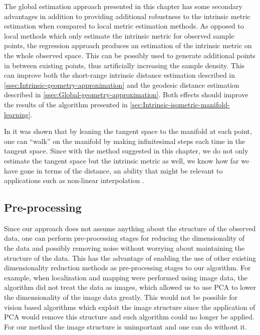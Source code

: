 	The global estimation approach presented in this chapter has some
	secondary advantages in addition to providing additional robustness
	to the intrinsic metric estimation when compared to local metric estimation
	methods. As opposed to local methods which only estimate the intrinsic
	metric for observed sample points, the regression approach produces
	an estimation of the intrinsic metric on the whole observed space.
	This can be possibly used to generate additional points in between
	existing points, thus artificially increasing the sample density.
	This can improve both the short-range intrinsic distance estimation
	described in \cref{ssec:Intrinsic-geometry-approximation} and
	the geodesic distance estimation described in \cref{ssec:Global-geometry-approximation}.
	Both effects should improve the results of the algorithm presented
	in \cref{sec:Intrinsic-isometric-manifold-learning}.
	
	In \cite{bengio2004non} it was shown that by leaning the tangent
	space to the manifold at each point, one can ``walk'' on the manifold
	by making infinitesimal steps each time in the tangent space. Since
	with the method suggested in this chapter, we do not only estimate
	the tangent space but the intrinsic metric as well, we know how far
	we have gone in terms of the distance, an ability that might be relevant
	to applications such as non-linear interpolation \cite{bregler1995nonlinear}.
	
	
	\subsection{Pre-processing}
		\label{subsec:Pre-processing}
	
	Since our approach does not assume anything about the structure of
	the observed data, one can perform pre-processing stages for reducing
	the dimensionality of the data and possibly removing noise without
	worrying about maintaining the structure of the data. This has the
	advantage of enabling the use of other existing dimensionality reduction
	methods as pre-processing stages to our algorithm. For example, when
	localization and mapping were performed using image data, the algorithm
	did not treat the data as images, which allowed us to use \ac{PCA}
	to lower the dimensionality of the image data greatly. This would
	not be possible for vision based algorithms which exploit the image
	structure since the application of \ac{PCA} would remove this structure
	and such algorithm could no longer be applied. For our method the
	image structure is unimportant and one can do without it.
	
